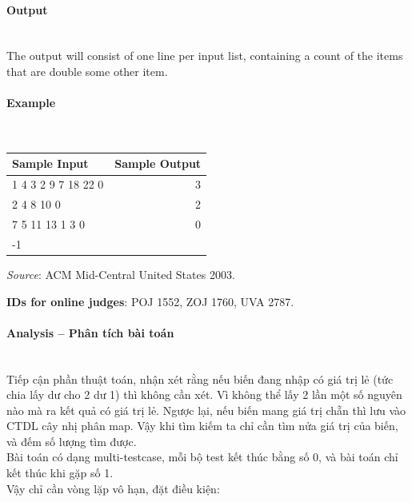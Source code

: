 \documentclass{article}
\begin{document}
\paragraph{Output}\mbox{} \\

The output will consist of one line per input list, containing a count of the items that are double
some other item.

\paragraph{Example}\mbox{} \\

\begin{table}[h]
    \centering
    \begin{tabular}{|l|r|}
        \hline
        \textbf{Sample Input} & \textbf{Sample Output} \\
        \hline
        1 4 3 2 9 7 18 22 0  &  3 \\ 
        2 4 8 10 0    & 2 \\ 
        7 5 11 13 1 3 0  &  0 \\ 
        -1   &  \\ \hline
    \end{tabular}
\end{table}

\textit{Source}: ACM Mid-Central United States 2003.

\textbf{IDs for online judges}: POJ 1552, ZOJ 1760, UVA 2787.


\paragraph{Analysis -- Phân tích bài toán} \mbox{} \\

Tiếp cận phần thuật toán, nhận xét rằng nếu biến đang nhập có giá trị lẻ (tức chia lấy dư cho 2 dư 1) thì không cần xét. Vì không thể lấy 2 lần một số nguyên nào mà ra kết quả có giá trị lẻ. Ngược lại, nếu biến mang giá trị chẵn thì lưu vào CTDL cây nhị phân map. Vậy khi tìm kiếm ta chỉ cần tìm nửa giá trị của biến, và đếm số lượng tìm được. \\

Bài toán có dạng multi-testcase, mỗi bộ test kết thúc bằng số 0, và bài toán chỉ kết thúc khi gặp số 1. \\

Vậy chỉ cần vòng lặp vô hạn, đặt điều kiện: \\
\end{document}
